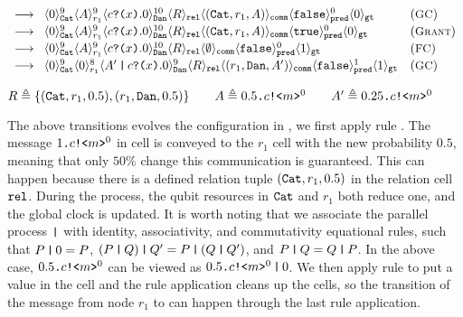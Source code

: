 {\footnotesize
\[
\begin{array}{ll}
\longrightarrow\;\;
\langle 0 \rangle^{9}_{\texttt{Cat}}\langle A \rangle^{9}_{r_1}
\langle c\texttt{?(}x\texttt{)}.0 \rangle^{10}_{\texttt{Dan}} 
\langle R \rangle_{\texttt{rel}}
\langle (\texttt{Cat},r_1,A) \rangle_{\texttt{comm}}
\langle \texttt{false} \rangle^{0}_{\texttt{pred}}
\langle 0 \rangle_{\texttt{gt}}
&
({\small \textsc{GC}})
\\[0.2em]
\longrightarrow\;\;
\langle 0 \rangle^{9}_{\texttt{Cat}}\langle A \rangle^{9}_{r_1}
\langle c\texttt{?(}x\texttt{)}.0 \rangle^{10}_{\texttt{Dan}} 
\langle R \rangle_{\texttt{rel}}
\langle (\texttt{Cat},r_1,A) \rangle_{\texttt{comm}}
\langle \texttt{true} \rangle^{0}_{\texttt{pred}}
\langle 0 \rangle_{\texttt{gt}}
&
({\small \textsc{Grant}})
\\[0.2em]
\longrightarrow\;\;
\langle 0 \rangle^{9}_{\texttt{Cat}}\langle A \rangle^{9}_{r_1}
\langle c\texttt{?(}x\texttt{)}.0 \rangle^{10}_{\texttt{Dan}} 
\langle R \rangle_{\texttt{rel}}
\langle \emptyset \rangle_{\texttt{comm}}
\langle \texttt{false} \rangle^{0}_{\texttt{pred}}
\langle 1 \rangle_{\texttt{gt}}
&
({\small \textsc{FC}})
\\[0.2em]
\longrightarrow\;\;
\langle 0 \rangle^{9}_{\texttt{Cat}}\langle 0 \rangle^{8}_{r_1}
\langle A'\,\texttt{|}\,c\texttt{?(}x\texttt{)}.0 \rangle^{9}_{\texttt{Dan}} 
\langle R \rangle_{\texttt{rel}}
\langle (r_1,\texttt{Dan},A') \rangle_{\texttt{comm}}
\langle \texttt{false} \rangle^{1}_{\texttt{pred}}
\langle 1 \rangle_{\texttt{gt}}
&
({\small \textsc{GC}})
\end{array}
\]
}
{\footnotesize
\begin{center}
$R\triangleq\{(\texttt{Cat},r_1,0.5), (r_1,\texttt{Dan},0.5)\}
\qquad
A\triangleq0.5\texttt{.}c\texttt{!<}m\texttt{>}^0
\qquad
A'\triangleq0.25\texttt{.}c\texttt{!<}m\texttt{>}^0$
\end{center}
}

The above transitions evolves the configuration in , we first apply rule . The message $1\texttt{.}c\texttt{!<}m\texttt{>}^0$ in cell  is conveyed to the $r_1$ cell with the new probability $0.5$, meaning that only $50\%$ change this communication is guaranteed.
This can happen because there is a defined relation tuple $(\texttt{Cat},r_1,0.5)$ in the relation cell $\texttt{rel}$. During the process, the qubit resources in $\texttt{Cat}$ and $r_1$ both reduce one, and the global clock is updated. 
It is worth noting that 
we associate the parallel process $\texttt{|}$ with identity, associativity, and commutativity equational rules, 
such that $P\,\texttt{|}\,0=P$, $(P\,\texttt{|}\,Q)\,\texttt{|}\,Q'=P\,\texttt{|}\,(Q\,\texttt{|}\,Q')$, and $P\,\texttt{|}\,Q=Q\,\texttt{|}\,P$.
In the above case, $0.5\texttt{.}c\texttt{!<}m\texttt{>}^0$ can be viewed as $0.5\texttt{.}c\texttt{!<}m\texttt{>}^0\,\texttt{|}\,0$.
We then apply rule  to put a  value in the  cell and the  rule application cleans up the cells, so the transition of the message from node $r_1$ to  can happen through the last  rule application.

